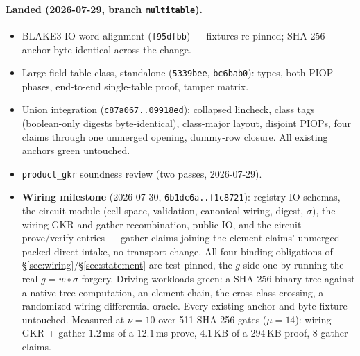 \documentclass[11pt]{article}
\newcommand{\code}[1]{\texttt{#1}}
\theoremstyle{definition}
\begin{document}
\paragraph{Landed (2026-07-29, branch \code{multitable}).}
\begin{itemize}[nosep]
  \item BLAKE3 IO word alignment (\code{f95dfbb}) --- fixtures re-pinned;
        SHA-256 anchor byte-identical across the change.
  \item Large-field table class, standalone (\code{5339bee},
        \code{bc6bab0}): types, both PIOP phases, end-to-end single-table
        proof, tamper matrix.
  \item Union integration (\code{c87a067..09918ed}): collapsed lincheck,
        class tags (boolean-only digests byte-identical), class-major
        layout, disjoint PIOPs, four claims through one unmerged opening,
        dummy-row closure. All existing anchors green untouched.
  \item \code{product\_gkr} soundness review (two passes, 2026-07-29).
  \item \textbf{Wiring milestone} (2026-07-30, \code{6b1dc6a..f1c8721}):
        registry IO schemas, the circuit module (cell space,
        validation, canonical wiring, digest, $\sigma$), the wiring GKR
        and gather recombination, public IO, and the circuit prove/verify
        entries --- gather claims joining the element claims' unmerged
        packed-direct intake, no transport change. All four binding
        obligations of \S\ref{sec:wiring}/\S\ref{sec:statement} are
        test-pinned, the $g$-side one by running the real $g = w \circ \sigma$
        forgery. Driving workloads green: a SHA-256 binary tree against a
        native tree computation, an element chain, the cross-class
        crossing, a randomized-wiring differential oracle. Every existing
        anchor and byte fixture untouched. Measured at $\nu = 10$ over 511
        SHA-256 gates ($\mu = 14$): wiring GKR + gather $1.2$\,ms of a
        $12.1$\,ms prove, $4.1$\,KB of a $294$\,KB proof, 8 gather claims.
\end{itemize}
\end{document}
